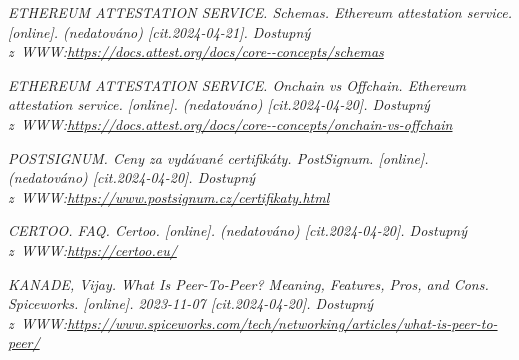 \documentclass[a4paper,12pt]{article}
\begin{document}
{	\it{ETHEREUM ATTESTATION SERVICE. Schemas. Ethereum attestation service. [online]. (nedatováno)} [cit.2024-04-21]. Dostupný z~WWW:\url{https://docs.attest.org/docs/core--concepts/schemas}
	
	
	\it{ETHEREUM ATTESTATION SERVICE. Onchain vs Offchain. Ethereum attestation service. [online]. (nedatováno)} [cit.2024-04-20]. Dostupný z~WWW:\url{https://docs.attest.org/docs/core--concepts/onchain-vs-offchain}
	
	
	
	\it{POSTSIGNUM. Ceny za vydávané certifikáty. PostSignum. [online]. (nedatováno)} [cit.2024-04-20]. Dostupný z~WWW:\url{https://www.postsignum.cz/certifikaty.html}
	
	
	\it{CERTOO. FAQ. Certoo. [online]. (nedatováno) } [cit.2024-04-20]. Dostupný z~WWW:\url{https://certoo.eu/}
	
	
	\it{KANADE, Vijay. What Is Peer-To-Peer? Meaning, Features, Pros, and Cons. Spiceworks.  [online]. 2023-11-07 }[cit.2024-04-20]. Dostupný z~WWW:\url{https://www.spiceworks.com/tech/networking/articles/what-is-peer-to-peer/}
	



	


	
}





\seznamobr  %


\seznamtab  %




\end{document}
